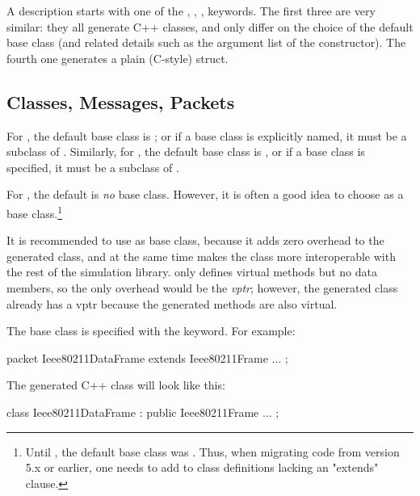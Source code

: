 A description starts with one of the , ,
,  keywords. The first three are very
similar: they all generate C++ classes, and only differ on the choice of the
default base class (and related details such as the argument list of the
constructor). The fourth one generates a plain (C-style) struct.

\subsection{Classes, Messages, Packets}
\label{sec:msg-defs:classes-messages-packets}
\label{sec:msg-defs:defining-classes} %
\label{sec:msg-defs:messages-and-packets} %
\label{sec:msg-defs:defining-messages-and-packets} %

For , the default base class is ; or if a base
class is explicitly named, it must be a subclass of . Similarly,
for , the default base class is , or if a
base class is specified, it must be a subclass of .

For , the default is \textit{no} base class. However, it is often a
good idea to choose  as a base class.\footnote{Until , the default base class was . Thus, when migrating code from
version 5.x or earlier, one needs to add  to class
definitions lacking an "extends" clause.}

\begin{note}
  It is recommended to use  as base class, because it adds zero
  overhead to the generated class, and at the same time makes the class more
  interoperable with the rest of the simulation library. 
  only defines virtual methods but no data members, so the only overhead would
  be the \textit{vptr}; however, the generated class already has a vptr because
  the generated methods are also virtual.
\end{note}

The base class is specified with the  keyword. For example:

\begin{msg}
packet Ieee80211DataFrame extends Ieee80211Frame
{
    ...
};
\end{msg}

The generated C++ class will look like this:

\begin{cpp}
class Ieee80211DataFrame : public Ieee80211Frame {
    ...
};
\end{cpp}


